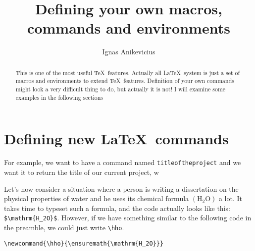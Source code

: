

\newcommand{\hho}{\ensuremath{\mathrm{H_2O}}}
\newcommand{\un}[1]{\unit{#1}}

\renewcommand{\thechemcmp}{\arabic{chemcmp}}
\renewcommand{\thechemcmpp}{\alph{chemcmpp}}
\newcommand{\cmpinc}{
    \refstepcounter{chemcmp}
    \setcounter{chemcmpp}{0}
}
\newcommand{\cmp}[1]{
    \cmpinc
    \textbf{\thechemcmp }
    \label{#1}
}
\newcommand{\cmppe}[1]{
    \refstepcounter{chemcmpp}
    \textbf{\thechemcmp\thechemcmpp }
    \label{#1}
}
\newcommand{\cmppn}[1]{
    \cmpinc
    \refstepcounter{chemcmpp}
    \textbf{\thechemcmp\thechemcmpp }
    \label{#1}
}

\usepackage[pdftex]{graphicx}
\graphicspath{{./figs/}}
\usepackage[update,verbose=false]{epstopdf}
\usepackage{tikz}
\newlength{\tikzunit}

\title{Defining your own macros, commands and environments}
\author{Ignas Anikevicius}



\maketitle

\begin{abstract}
    This is one of the most useful \TeX\ features. Actually all \LaTeX\ system
    is just a set of macros and environments to extend \TeX\ features.
    Definition of your own commands might look a very difficult thing to do, but
    actually it is not! I will examine some examples in the following sections
\end{abstract}

\tableofcontents

\section{Defining new \LaTeX\ commands}

For example, we want to have a command named \verb|titleoftheproject| and we
want it to return the title of our current project, w

Let's now consider a situation where a person is writing a dissertation on the
physical properties of water and he uses its chemical formula $\left( \hho
\right)$ a lot. It takes time to typeset such a formula, and the code actually
looks like this: \verb|$\mathrm{H_2O}$|. However, if we have
something similar to the following code in the preamble, we could just write
\verb|\hho|.
\begin{lstlisting}
\newcommand{\hho}{\ensuremath{\mathrm{H_2O}}}
\end{lstlisting}

